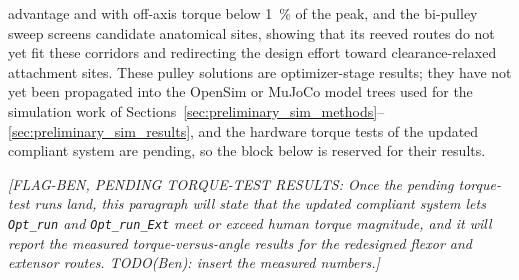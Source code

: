 advantage and with off-axis torque below \qty{1}{\percent} of the peak, and the bi-pulley sweep screens candidate anatomical sites, showing that its reeved routes do not yet fit these corridors and redirecting the design effort toward clearance-relaxed attachment sites. These pulley solutions are optimizer-stage results; they have not yet been propagated into the OpenSim or MuJoCo model trees used for the simulation work of Sections~\ref{sec:preliminary_sim_methods}--\ref{sec:preliminary_sim_results}, and the hardware torque tests of the updated compliant system are pending, so the block below is reserved for their results.

\noindent\textit{[FLAG-BEN, PENDING TORQUE-TEST RESULTS: Once the pending torque-test runs land, this paragraph will state that the updated compliant system lets \texttt{Opt\_run} and \texttt{Opt\_run\_Ext} meet or exceed human torque magnitude, and it will report the measured torque-versus-angle results for the redesigned flexor and extensor routes. TODO(Ben): insert the measured numbers.]}
